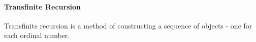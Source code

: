 

\paragraph{Transfinite Recursion}
Transfinite recursion is a method of constructing a sequence of objects - one for each ordinal number.













